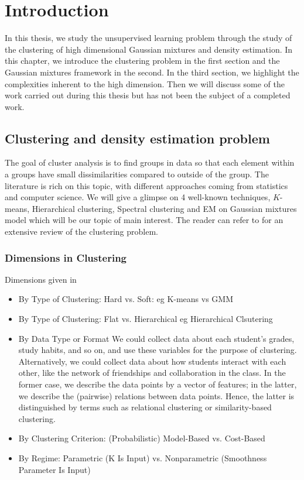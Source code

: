 
\chapter{Introduction\label{chap:intro}}
\minitoc

In this thesis, we study the unsupervised learning problem through the study of the clustering of high dimensional Gaussian mixtures and density estimation. In this chapter, we introduce the clustering problem in the first section and the Gaussian mixtures framework in the second. In the third section, we highlight the complexities inherent to the high dimension. Then we will discuss some of the work carried out during this thesis but has not been the subject of a completed work.

\section{Clustering and density estimation problem}

The goal of cluster analysis is to find groups in data so that each element within a groups have small dissimilarities compared to outside of the group. The literature is rich on this topic, with different approaches coming from statistics and computer science. We will give a glimpse on 4 well-known techniques, $K$-means, Hierarchical clustering, Spectral clustering and EM on Gaussian mixtures model which will be our topic of main interest. The reader can refer to \citep{hennig2015handbook} for an extensive review of the clustering problem.

\subsection{Dimensions in Clustering}
Dimensions given in \citep{hennig2015handbook}

\begin{itemize}
  \item By Type of Clustering: Hard vs. Soft: eg K-means vs GMM
  \item By Type of Clustering: Flat vs. Hierarchical eg Hierarchical Clsutering
  \item By Data Type or Format
  We could collect data about each student’s grades, study habits, and so on, and use these variables for the purpose of clustering. Alternatively, we could collect data about how students interact with each other, like the network of friendships and collaboration in the class. In the former case, we describe the data points by a vector of features; in the latter, we describe the (pairwise) relations between data points. Hence, the latter is distinguished by terms such as relational clustering or similarity-based clustering.
  \item By Clustering Criterion: (Probabilistic) Model-Based vs. Cost-Based
  \item By Regime: Parametric (K Is Input) vs. Nonparametric (Smoothness Parameter Is Input)
\end{itemize}

